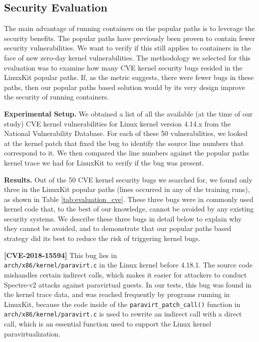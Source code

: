 \subsection{Security Evaluation}
\label{sec.evaluation.security} 
The main advantage of running containers on the popular paths is to leverage the security benefits. 
The popular paths have previously been proven to contain fewer security vulnerabilities. 
We want to verify if this still applies to containers in the face of new zero-day kernel vulnerabilities. 
The methodology we selected for this evaluation was to examine how many CVE kernel security bugs resided in the LinuxKit popular paths. 
If, as the metric suggests, there were fewer bugs in these paths, then our popular paths based solution would by its very design improve the security of running containers.

\textbf{Experimental Setup.}
We obtained a list of all the available (at the time of our study) CVE kernel vulnerabilities for Linux kernel version 4.14.x from the National Vulnerability Database. 
For each of these 50 vulnerabilities, we looked at the kernel patch that fixed the bug to identify the source line numbers that correspond to it. 
We then compared the line numbers against the popular paths kernel trace we had for LinuxKit to verify if the bug was present.

\textbf{Results.}
Out of the 50 CVE kernel security bugs we searched for, we found only three in the LinuxKit popular paths (lines occurred in any of the training runs), 
as shown in Table \ref{tab:evaluation_cve}. 
These three bugs were in commonly used kernel code that,   to the best of our knowledge, cannot be avoided by any existing security systems. 
We describe these three bugs in detail below to explain why they cannot be avoided, 
and to demonstrate that our popular paths based strategy did its best to reduce the risk of triggering kernel bugs.

\textbf{[CVE-2018-15594]}
This bug lies in \\
\verb|arch/x86/kernel/paravirt.c| in the Linux kernel before 4.18.1. 
The source code mishandles certain indirect calls, which makes it easier for attackers to conduct Spectre-v2 attacks against paravirtual guests. 
In our tests, this bug was found in the kernel trace data, and was reached frequently by programs running in LinuxKit, 
because the code inside of the \verb|paravirt_patch_call()| function in \\
\verb|arch/x86/kernel/paravirt.c| is used to rewrite an indirect call with a direct call, 
which is an essential function used to support the Linux kernel paravirtualization. 


